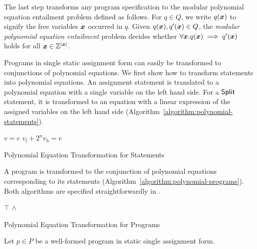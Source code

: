
The last step transforms any program specification to the 
modular polynomial equation entailment problem defined as follows. For
$q \in Q$, we write $q(\vx)$ to signify the free variables $\vx$
occurred in $q$. Given $q(\vx), q'(\vx) \in Q$, the \emph{modular
  polynomial equation entailment} problem decides whether $\forall
\vx. q(\vx) \implies q'(\vx)$ holds for all $\vx \in \bbfZ^{|\vx|}$.

Programs in single static assignment form can easily be transformed to
conjunctions of polynomial equations. We first show how to transform
statements into polynomial equations. An assignment statement is
translated to a polynomial equation with a single variable on the left
hand side. For a $\mbox{\textsf{Split}}$ statement, it is transformed to an
equation with a linear expression of the assigned variables on the
left hand side (Algorithm~\ref{algorithm:polynomial-statements}). 
\begin{algorithm}
  \begin{algorithmic}[1]
        \Return $v = e$
      \EndCase
        \Return $v_l + 2^n v_h = e$
      \EndCase
    \EndMatch
    \EndFunction
  \end{algorithmic}
  \caption{Polynomial Equation Transformation for Statements}
  \label{algorithm:polynomial-statements}
\end{algorithm}

A program is transformed to the conjunction of polynomial
equations corresponding to its statements
(Algorithm~\ref{algorithm:polynomial-programs}). Both algorithms are
specified straightforwardly in \coq.

\begin{algorithm}
  \begin{algorithmic}[1]
      \Case{$\epsilon$} \Return $\top$ \EndCase
        \Return {} $\wedge$
      \EndCase
    \EndMatch
    \EndFunction
  \end{algorithmic}
  \caption{Polynomial Equation Transformation for Programs}
  \label{algorithm:polynomial-programs}
\end{algorithm}



\begin{theorem}
  Let $p \in P$ be a well-formed program in static single assignment
  form. 
\end{theorem}


